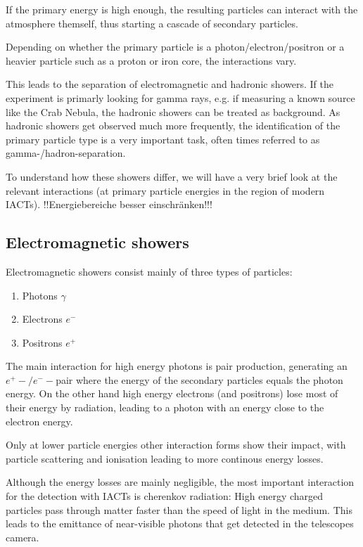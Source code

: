 If the primary energy is high enough, the resulting 
particles can interact with the atmosphere themself, thus starting a 
cascade of secondary particles.

Depending on whether the primary particle is 
a photon/electron/positron or a heavier particle such as a proton 
or iron core, the interactions vary.

This leads to the separation of electromagnetic and hadronic showers.
If the experiment is primarly looking for 
gamma rays, e.g. if measuring a known source like the Crab Nebula, 
the hadronic showers can be treated as background.
As hadronic showers get observed much more frequently, 
the identification of the primary particle type is a very important 
task, often times referred to as gamma-/hadron-separation.

To understand how these showers differ, we will have a very brief look
at the relevant interactions (at primary particle energies in the 
region of modern IACTs).
!!Energiebereiche besser einschränken!!!


\subsection{Electromagnetic showers}
Electromagnetic showers consist mainly of three types of particles:
\begin{enumerate}
	\item{Photons $\gamma$}
	\item{Electrons $e^-$}
	\item{Positrons $e^+$}
\end{enumerate}

The main interaction for high energy photons is pair 
production, generating an $e^+-/e^--$pair where the energy of 
the secondary particles equals the photon energy.
On the other hand high energy electrons (and positrons) lose 
most of their energy by radiation, leading to a photon with 
an energy close to the electron energy.

Only at lower particle energies other interaction forms show their impact,
with particle scattering and ionisation 
leading to more continous energy losses.

Although the energy losses are mainly negligible, 
the most important interaction for the detection with IACTs is 
cherenkov radiation: High energy charged particles pass through 
matter faster than the speed of light in the medium. This leads
to the emittance of near-visible photons that get detected 
in the telescopes camera. 

